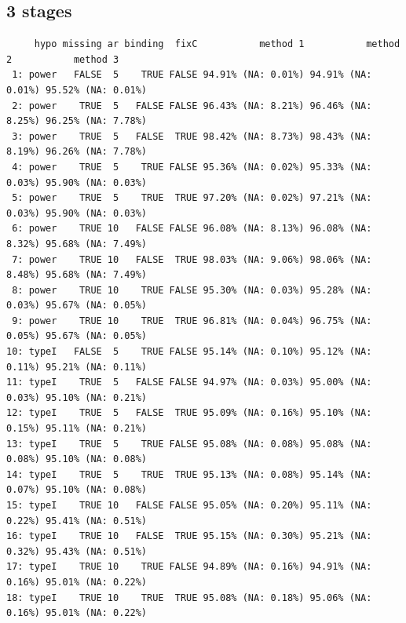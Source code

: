 \documentclass[12pt]{article}
\begin{document}
\clearpage

\subsection{3 stages}
\label{sec:org4c3e86c}

\begin{verbatim}
     hypo missing ar binding  fixC           method 1           method 2           method 3
 1: power   FALSE  5    TRUE FALSE 94.91% (NA: 0.01%) 94.91% (NA: 0.01%) 95.52% (NA: 0.01%)
 2: power    TRUE  5   FALSE FALSE 96.43% (NA: 8.21%) 96.46% (NA: 8.25%) 96.25% (NA: 7.78%)
 3: power    TRUE  5   FALSE  TRUE 98.42% (NA: 8.73%) 98.43% (NA: 8.19%) 96.26% (NA: 7.78%)
 4: power    TRUE  5    TRUE FALSE 95.36% (NA: 0.02%) 95.33% (NA: 0.03%) 95.90% (NA: 0.03%)
 5: power    TRUE  5    TRUE  TRUE 97.20% (NA: 0.02%) 97.21% (NA: 0.03%) 95.90% (NA: 0.03%)
 6: power    TRUE 10   FALSE FALSE 96.08% (NA: 8.13%) 96.08% (NA: 8.32%) 95.68% (NA: 7.49%)
 7: power    TRUE 10   FALSE  TRUE 98.03% (NA: 9.06%) 98.06% (NA: 8.48%) 95.68% (NA: 7.49%)
 8: power    TRUE 10    TRUE FALSE 95.30% (NA: 0.03%) 95.28% (NA: 0.03%) 95.67% (NA: 0.05%)
 9: power    TRUE 10    TRUE  TRUE 96.81% (NA: 0.04%) 96.75% (NA: 0.05%) 95.67% (NA: 0.05%)
10: typeI   FALSE  5    TRUE FALSE 95.14% (NA: 0.10%) 95.12% (NA: 0.11%) 95.21% (NA: 0.11%)
11: typeI    TRUE  5   FALSE FALSE 94.97% (NA: 0.03%) 95.00% (NA: 0.03%) 95.10% (NA: 0.21%)
12: typeI    TRUE  5   FALSE  TRUE 95.09% (NA: 0.16%) 95.10% (NA: 0.15%) 95.11% (NA: 0.21%)
13: typeI    TRUE  5    TRUE FALSE 95.08% (NA: 0.08%) 95.08% (NA: 0.08%) 95.10% (NA: 0.08%)
14: typeI    TRUE  5    TRUE  TRUE 95.13% (NA: 0.08%) 95.14% (NA: 0.07%) 95.10% (NA: 0.08%)
15: typeI    TRUE 10   FALSE FALSE 95.05% (NA: 0.20%) 95.11% (NA: 0.22%) 95.41% (NA: 0.51%)
16: typeI    TRUE 10   FALSE  TRUE 95.15% (NA: 0.30%) 95.21% (NA: 0.32%) 95.43% (NA: 0.51%)
17: typeI    TRUE 10    TRUE FALSE 94.89% (NA: 0.16%) 94.91% (NA: 0.16%) 95.01% (NA: 0.22%)
18: typeI    TRUE 10    TRUE  TRUE 95.08% (NA: 0.18%) 95.06% (NA: 0.16%) 95.01% (NA: 0.22%)
\end{verbatim}
\end{document}

